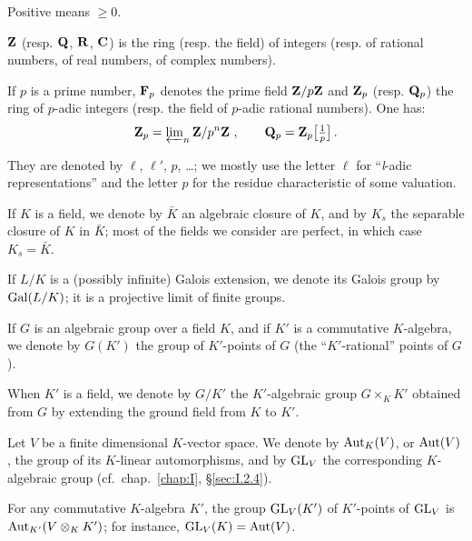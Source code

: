 

Positive means $\geq 0$.

$\mathbf{Z}$ (resp. $\mathbf{Q}$, $\mathbf{R}$, $\mathbf{C}$) is the ring (resp. the field) of integers
(resp. of rational numbers, of real numbers, of complex numbers).

If $p$ is a prime number, $\mathbf{F}_p$ denotes the prime field $\mathbf{Z}/p\mathbf{Z}$ and
$\mathbf{Z}_p$ (resp. $\mathbf{Q}_p$) the ring of $p$-adic integers (resp. the field of
$p$-adic rational numbers). One has:
\[
\mathbf{Z}_p=\varprojlim\nolimits_n \mathbf{Z}/p^n\mathbf{Z}\ ,\qquad \mathbf{Q}_p=\mathbf{Z}_p\big[\tfrac1p\big]\,.
\]


They are denoted by $\ell$, $\ell'$, $p$, \dots; we mostly use the letter
$\ell$ for ``\textit{l}-adic representations'' and the letter $p$ for the
residue characteristic of some valuation.


If $K$ is a field, we denote by $\bar K$ an algebraic closure of $K$, and
by $K_s$ the separable closure of $K$ in $\bar K$; most of the fields we
consider are perfect, in which case $K_s=\bar K$.

If $L/K$ is a (possibly infinite) Galois extension, we denote its Galois
group by $\mathrm{Gal}(L/K)$; it is a projective limit of finite groups.


If $G$ is an algebraic group over a field $K$, and if $K'$ is a
commutative $K$-algebra, we denote by $G(K')$ the group of $K'$-points of
$G$ (the ``$K'$-rational'' points of $G$).

When $K'$ is a field, we denote by $G/K'$ the $K'$-algebraic group
$G\times_K K'$ obtained from $G$ by extending the ground field from $K$
to $K'$.

Let $V$ be a finite dimensional $K$-vector space. We denote by
$\mathrm{Aut}_K(V)$, or $\mathrm{Aut}(V)$, the group of its $K$-linear automorphisms, and
by $\mathrm{GL}_V$ the corresponding $K$-algebraic group (cf.~chap.~\ref{chap:I},
\S\ref{sec:I.2.4}).

For any commutative $K$-algebra $K'$, the group $\mathrm{GL}_V(K')$ of
$K'$-points of $\mathrm{GL}_V$ is $\mathrm{Aut}_{K'}(V\mathbin{\otimes}_K K')$; for instance,
$\mathrm{GL}_V(K)=\mathrm{Aut}(V)$.
